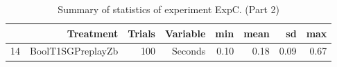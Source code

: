 \begin{table}[ht]
\centering
\begin{tabular}{rrrrrrrr}
  \hline
 & Treatment & Trials & Variable & min & mean & sd & max \\ 
  \hline
14 & BoolT1SGPreplayZb & 100 & Seconds & 0.10 & 0.18 & 0.09 & 0.67 \\ 
   \hline
\end{tabular}
\caption{Summary of statistics of experiment ExpC. (Part 2)} 
\end{table}
